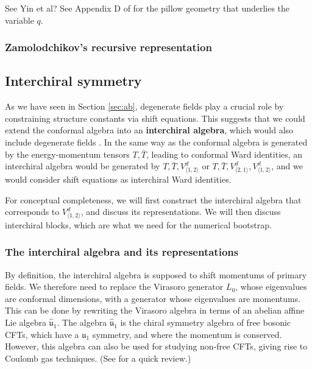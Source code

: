 \documentclass[12pt, a4paper]{article}
\theoremstyle{break}
\begin{document}
See Yin et al? See Appendix D of \cite{msz15} for the pillow geometry that underlies the variable $q$.

\subsubsection{Zamolodchikov's recursive representation}

\subsection{Interchiral symmetry} \label{sec:icb}

As we have seen in Section \ref{sec:ab}, degenerate fields play a crucial role by constraining structure constants via shift equations. This suggests that we could extend the conformal algebra into an  \textbf{interchiral algebra}, which would also include degenerate fields \cite{grs12}. In the same way as the conformal algebra is generated by the energy-momentum tensors $T,\bar T$, leading to conformal Ward identities, an interchiral algebra would be generated by $T,\bar T,V^d_{\langle 1,2\rangle}$ or $T,\bar T,V^d_{\langle 2,1\rangle},V^d_{\langle 1,2\rangle}$, and we would consider shift equations as interchiral Ward identities. 

For conceptual completeness, we will first construct the interchiral algebra that corresponds to $V^d_{\langle 1,2\rangle}$, and discuss its representations. We will then discuss interchiral blocks, which are what we need for the numerical bootstrap.

\subsubsection{The interchiral algebra and its representations}

By definition, the interchiral algebra is supposed to shift momentums of primary fields. We therefore need to replace the Virasoro generator $L_0$, whose eigenvalues are conformal dimensions, with a generator whose eigenvalues are momentums. This can be done by rewriting the Virasoro algebra in terms of an abelian affine Lie algebra $\hat{\mathfrak{u}}_1$. The algebra $\hat{\mathfrak{u}}_1$ is the chiral symmetry algebra of free bosonic CFTs, which have a $\mathfrak{u}_1$ symmetry, and where the momentum is conserved. 
However, this algebra can also be used for studying non-free CFTs, giving rise to Coulomb gas techniques. (See \cite[Section 4.1]{rib14} for a quick review.)
\end{document}
